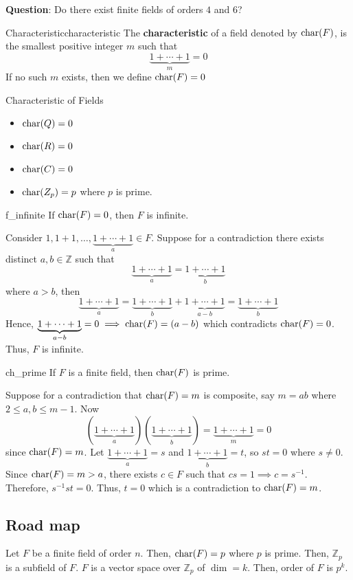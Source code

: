\textbf{Question}: Do there exist finite fields of orders $ 4 $ and $ 6 $?

\begin{Definition}{Characteristic}{characteristic}
    The \textbf{characteristic} of a field denoted by $ \operatorname{char}(F) $, is the smallest
    positive integer $ m $ such that
    \[ \underbrace{1+\cdots+1}_{m}=0 \]
    If no such $ m $ exists, then we define $ \operatorname{char}(F)=0 $
\end{Definition}

\begin{Example}{Characteristic of Fields}{}
    \begin{itemize}
        \item $ \operatorname{char}(\relax{Q})=0 $
        \item $ \operatorname{char}(\relax{R})=0 $
        \item $ \operatorname{char}(\relax{C})=0 $
        \item $ \operatorname{char}(\relax{Z}_p)=p $ where $ p $ is prime.
    \end{itemize}
\end{Example}

\begin{Theorem}{}{f_infinite}
    If $ \operatorname{char}(F)=0 $, then $ F $ is infinite.
\end{Theorem}

\begin{Proof}{}{}
    Consider $ 1,1+1,\ldots,\underbrace{1+\cdots+1}_{a}\in F $.
    Suppose for a contradiction there exists distinct $ a,b\in\mathbb{Z} $
    such that
    \[ \underbrace{1+\cdots+1}_{a}=\underbrace{1+\cdots+1}_{b} \]
    where $ a>b $, then
    \[ \underbrace{1+\cdots+1}_{a}=\underbrace{1+\cdots+1}_{b}+
        \underbrace{1+\cdots+1}_{a-b}=\underbrace{1+\cdots+1}_{b} \]
    Hence, $ \underbrace{1+\cdots+1}_{a-b}=0\implies \operatorname{char}(F)=(a-b) $
    which contradicts $ \operatorname{char}(F)=0 $. Thus, $ F $ is infinite.
\end{Proof}

\begin{Theorem}{}{ch_prime}
    If $ F $ is a finite field, then $ \operatorname{char}(F) $ is prime.
\end{Theorem}

\begin{Proof}{}{}
    Suppose for a contradiction that $ \operatorname{char}(F)=m $ is composite,
    say $ m=ab $ where
    $ 2\leqslant a,b\leqslant m-1 $. Now
    \[ (\underbrace{1+\cdots+1}_{a})(\underbrace{1+\cdots+1}_{b})
        =\underbrace{1+\cdots+1}_{m}=0 \]
    since $ \operatorname{char}(F)=m $. Let $ \underbrace{1+\cdots+1}_{a}=s $
    and $ \underbrace{1+\cdots+1}_{b}=t $, so $ st=0 $ where $ s\neq 0 $.
    Since $ \operatorname{char}(F)=m>a $, there exists $ c\in F $ such that
    $ cs=1 \implies c=s^{-1} $. Therefore, $ s^{-1}st=0 $. Thus,
    $ t=0 $ which is a contradiction to $ \operatorname{char}(F)=m $.
\end{Proof}

\subsection*{Road map} Let $ F $ be a finite field of order $ n $.
Then, $ \operatorname{char}(F)=p $ where $ p $ is prime. Then, $ \mathbb{Z}_p $ is a subfield
of $ F $. $ F $ is a vector space over $ \mathbb{Z}_p $ of $ \dim=k $.
Then, order of $ F $ is $ p^k $.
